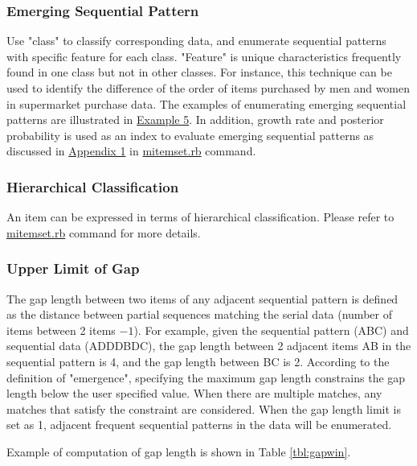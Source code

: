 \vspace{1em}

\subsubsection*{Emerging Sequential Pattern}
Use  "class" to classify corresponding data, and enumerate sequential patterns with specific feature for each class. "Feature" is unique characteristics frequently found in one class but not in other classes. For instance, this technique can be used to identify the difference of the order of items purchased by men and women in supermarket purchase data.  
The examples of enumerating emerging sequential patterns are illustrated in \hyperref[ex:ep1]{Example 5}. In addition, growth rate and posterior probability is used as an index  to evaluate emerging sequential patterns as discussed in \hyperref[sect:ep]{Appendix 1} in \hyperref[sect:mitemset]{mitemset.rb} command. 


\subsubsection*{Hierarchical Classification}
An item can be expressed in terms of hierarchical classification. Please refer to \hyperref[sect:mitemset]{mitemset.rb} command for more details.


\subsubsection*{Upper Limit of Gap}


The gap length between two items of any adjacent sequential pattern is defined as the distance  between partial sequences matching the serial data (number of items between 2 items $-1$). 
For example, given the sequential pattern (ABC) and sequential data (ADDDBDC), the gap length between 2 adjacent items AB in the sequential pattern is 4, and the gap length between BC is 2. According to the definition of "emergence", specifying the maximum gap length constrains the gap length below the user specified value.  When there are multiple matches, any matches that satisfy the constraint are considered.  When the gap length limit is set as 1, adjacent frequent sequential patterns in the data will be enumerated. 

Example of computation of gap length is shown in Table \ref{tbl:gapwin}. 


